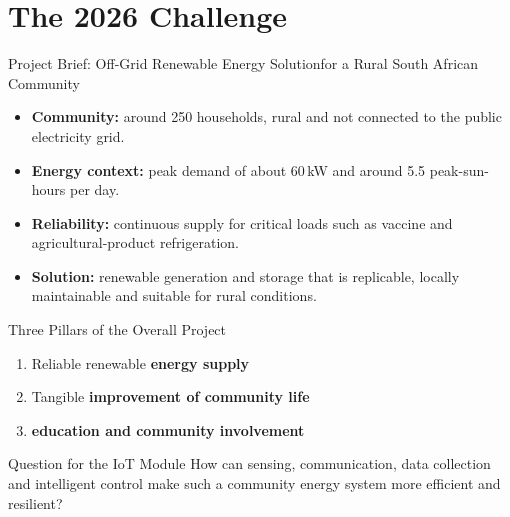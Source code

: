 \part[nopartpage]{The 2026 Challenge}

\begin{frame}{Project Brief: Off-Grid Renewable Energy Solution}{for a Rural South African Community}
\begin{itemize}
    \item \textbf{Community:} around 250 households, rural and not connected to the public electricity grid.
    \item \textbf{Energy context:} peak demand of about 60\,kW and around 5.5 peak-sun-hours per day.
    \item \textbf{Reliability:} continuous supply for critical loads such as vaccine and agricultural-product refrigeration.
    \item \textbf{Solution:} renewable generation and storage that is replicable, locally maintainable and suitable for rural conditions.
\end{itemize}
\begin{block}{Three Pillars of the Overall Project}
\begin{enumerate}
    \item Reliable renewable \textbf{energy supply}
    \item Tangible \textbf{improvement of community life}
    \item \textbf{education and community involvement}
\end{enumerate}
\end{block}
\begin{alertblock}{Question for the IoT Module}
How can sensing, communication, data collection and intelligent control make such a community energy system more efficient and resilient?
\end{alertblock}
\end{frame}
